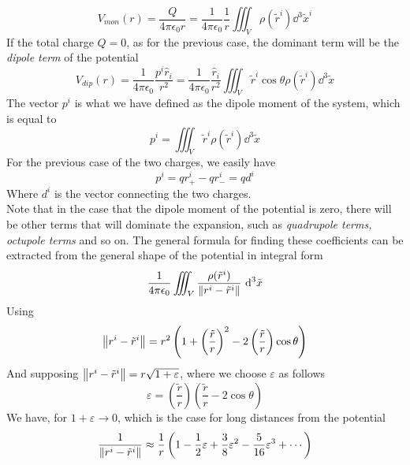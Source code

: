 \documentclass[../electromagnetism]{subfiles}
\begin{document}
\begin{equation}
	V_{mon}(r)=\frac{Q}{4\pi\epsilon_0r}=\frac{1}{4\pi\epsilon_0}\frac{1}{r}\iiint_V\rho(\tilde{r}^i)\dd^3\tilde{x}^i
	\label{eq:monopolepot}
\end{equation}
If the total charge $Q=0$, as for the previous case, the dominant term will be the \textit{dipole term} of the potential
\begin{equation}
	V_{dip}(r)=\frac{1}{4\pi\epsilon_0}\frac{p^i\hat{r}_i}{r^2}=\frac{1}{4\pi\epsilon_0}\frac{\hat{r}_i}{r^2}\iiint_V\tilde{r}^i\cos\theta\rho(\tilde{r}^i)\dd^3\tilde{x}
	\label{eq:dipolepot}
\end{equation}
The vector $p^i$ is what we have defined as the dipole moment of the system, which is equal to
\begin{equation}
	p^i=\iiint_V\tilde{r}^i\rho\left( \tilde{r}^i \right)\dd^3\tilde{x}
	\label{eq:dipmomvector}
\end{equation}
For the previous case of the two charges, we easily have
\begin{equation}
	p^i=qr_+^i-qr_-^i=qd^i
	\label{eq:dipmompuredip}
\end{equation}
Where $d^i$ is the vector connecting the two charges.\\
Note that in the case that the dipole moment of the potential is zero, there will be other terms that will dominate the expansion, such as \textit{quadrupole terms, octupole terms} and so on.
The general formula for finding these coefficients can be extracted from the general shape of the potential in integral form
\begin{equation*}
	\frac{1}{4\pi\epsilon_0}\iiint_V\frac{\rho(\tilde{r}^i)}{\norm{r^i-\tilde{r}^i}}\ \mathrm{d}^3\tilde{x}
\end{equation*}
Using
\begin{equation*}
	\norm{r^i-\tilde{r}^i}=r^2\left( 1+\left( \frac{\tilde{r}}{r} \right)^2-2\left( \frac{\tilde{r}}{r} \right)\cos\theta \right)
\end{equation*}
And supposing $\norm{r^i-\tilde{r}^i}=r\sqrt{1+\varepsilon}$, where we choose $\varepsilon$ as follows
\begin{equation*}
	\varepsilon=\left( \frac{\tilde{r}}{r} \right)\left( \frac{\tilde{r}}{r}-2\cos\theta \right)
\end{equation*}
We have, for $1+\varepsilon\to0$, which is the case for long distances from the potential
\begin{equation}
	\frac{1}{\norm{r^i-\tilde{r}^i}}\approx\frac{1}{r}\left( 1-\frac{1}{2}\varepsilon+\frac{3}{8}\varepsilon^2-\frac{5}{16}\varepsilon^3+\cdots\right)
	\label{eq:legendrepolapprox}
\end{equation}
\end{document}
